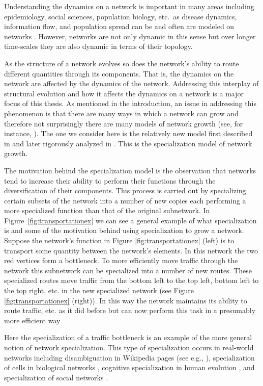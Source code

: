 \documentclass[12pt]{thesis}
\begin{document}
Understanding the {dynamics on} a network is important in many areas including epidemiology, social sciences, population biology, etc.~as disease dynamics, information flow, and population spread can be and often are modeled on networks \cite{Prulzj07}.
However, networks are not only dynamic in this sense but over longer time-scales they are also dynamic in terms of their topology.

As the structure of a network evolves so does the network's ability to route different quantities through its components. 
That is, the {dynamics on} the network {are} affected by the {dynamics of} the network.
Addressing this interplay of structural evolution and how it affects the {dynamics on} a network is a major focus of this thesis.
As mentioned in the introduction, an issue in addressing this {phenomenon} is that there are many ways in which a network can grow and therefore not surprisingly there are many models of network growth (see, for instance, \cite{Newman10}).
The one we consider here is the relatively new model first described in \cite{8} and later rigorously analyzed in \cite{Bunimovich20}.
This is the specialization model of network growth.

The motivation behind the specialization model is the observation that networks tend to increase their ability to perform their functions through the diversification of their components.
This process is carried out by specializing certain subsets of the network into a number of new copies each performing a more specialized function than that of the original subnetwork.
In Figure~\ref{fig:transportationex} we can see a general example of what specialization is and some of the motivation behind using specialization to grow a network.
Suppose the network's function in Figure \ref{fig:transportationex} (left) is to transport some quantity between the network's elements.
In this network the two red vertices form a bottleneck. 
To more efficiently move traffic through the network this subnetwork can be specialized into a number of new routes.
These specialized routes move traffic from the bottom left to the top left, bottom left to the top right, etc. in the new specialized network (see Figure \ref{fig:transportationex} (right)).
In this way the network maintains its ability to route traffic, etc. as it did before but can now perform this task in a presumably more efficient way

Here the specialization of a traffic bottleneck is an example of the more general notion of {network specialization}.
This type of specialization occurs in real-world networks including disambiguation in Wikipedia pages (see e.g., \cite{Bunimovich20}), specialization of cells in biological networks \cite{Sporns13,Herskowitz89, Nikolic17}, cognitive specialization in human evolution \cite{Povinelli95}, and specialization of social networks \cite{Salz01}.
\end{document}
